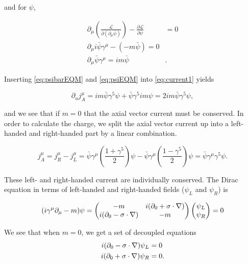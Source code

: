 \documentclass[11pt, a4paper]{amsart}
\begin{document}
and for $\psi$,

\begin{align}
\partial_\mu \left(\frac{\mathcal{L}}{\partial (\partial_\mu \bar{\psi})} \right) - \frac{\partial \mathcal{L}}{\partial \bar{\psi}} &= 0 \\
\partial_\mu i\bar{\psi} \gamma^\mu - (-m\bar{\psi}) = 0 \\
\partial_\mu \bar{\psi} \gamma^\mu = im\bar{\psi}& \label{eq:psiEQM}.
\end{align}

Inserting \autoref{eq:psibarEQM} and \autoref{eq:psiEQM} into \autoref{eq:current1} yields

\begin{equation}
\partial_u j^\mu_A = im\bar{\psi}\gamma^5\psi + \bar{\psi}\gamma^5 im \psi = 2im\bar{\psi}\gamma^5 \psi,
\end{equation}

and we see that if $m=0$ that the axial vector current  must be conserved. In order to calculate the charge, we split the axial vector current up into a left-handed and right-handed part by a linear combination.

\begin{equation}
\label{eq:rightandleftcurrent}
j_A^\mu = j_R^\mu - j_L^\mu = \bar{\psi} \gamma^\mu\left(\frac{1 + \gamma^5}{2} \right)\psi - \bar{\psi} \gamma^\mu \left( \frac{1 - \gamma^5}{2}\right) \psi = \bar{\psi}\gamma^\mu\gamma^5\psi.
\end{equation}

These left- and right-handed current are individually  conserved. The Dirac equation in terms of left-handed and right-handed fields ($\psi_L$ and $\psi_R$) is

\begin{equation}
(i\gamma^\mu \partial_\mu - m ) \psi = \begin{pmatrix}
-m & i(\partial_0 + \vb{\sigma} \cdot \nabla) \\
i(\partial_0 - \vb{\sigma} \cdot \nabla) & -m
\end{pmatrix}
\begin{pmatrix}
\psi_L \\ \psi_R
\end{pmatrix}
= 0 
\end{equation}

We see that when $m=0$, we get a set of decoupled equations
\begin{align}
i(\partial_0 - \vb{\sigma} \cdot \nabla) \psi_L &= 0 \\
i(\partial_0 + \vb{\sigma} \cdot \nabla) \psi_R &= 0.
\end{align}
\end{document}
